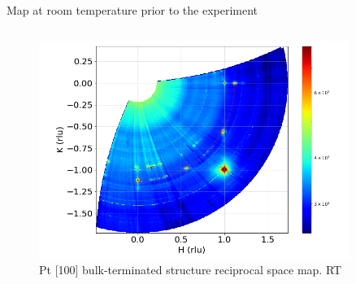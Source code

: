 \begin{frame}{Map at room temperature prior to the experiment}
    \begin{columns}
    

    
        \begin{figure}
        \centering
        \includegraphics[width=0.9\textwidth]{Figures/sxrd_data/maps/Map_hkl_surf_or_602-651.png}
        \caption{Pt [100] bulk-terminated structure reciprocal space map. RT}
        \label{fig:ArgonRT}
    \end{figure}
        
    \end{columns}

\end{frame}